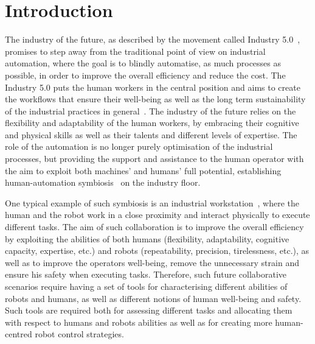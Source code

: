 
\chapter{Introduction} %

\label{ch:intro} %




The industry of the future, as described by the movement called Industry 5.0~\cite{MADDIKUNTA2022ind50}, promises to step away from the traditional point of view on industrial automation, where the goal is to blindly automatise, as much processes as possible, in order to improve the overall efficiency and reduce the cost. The Industry 5.0 puts the human workers in the central position and aims to create the workflows that ensure their well-being as well as the long term sustainability of the industrial practices in general~\cite{XU2021ind50}. The industry of the future relies on the flexibility and adaptability of the human workers, by embracing their cognitive and physical skills as well as their talents and different levels of expertise. The role of the automation is no longer purely optimisation of the industrial processes, but providing the support and assistance to the human operator with the aim to exploit both machines' and humans' full potential, establishing human-automation symbiosis~\cite{LENG2022ind50} on the industry floor.
 
One typical example of such symbiosis is an industrial workstation~\cite{SIMOES2022workplace}, where the human and the robot work in a close proximity and interact physically to execute different tasks. The aim of such collaboration is to improve the overall efficiency by exploiting the abilities of both humans (flexibility, adaptability, cognitive capacity, expertise, etc.) and robots (repeatability, precision, tirelessness, etc.), as well as to improve the operators well-being, remove the unnecessary strain and ensure his safety when executing tasks. Therefore, such future collaborative scenarios require having a set of tools for characterising different abilities of robots and humans, as well as different notions of human well-being and safety. Such tools are required both for assessing different tasks and allocating them with respect to humans and robots abilities as well as for creating more human-centred robot control strategies.

